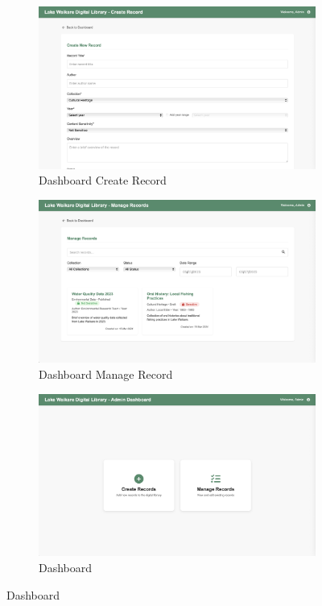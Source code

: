 \begin{figure}[H]
  \begin{subfigure}[b]{0.3\textwidth}
    \includegraphics[width=\textwidth]{screenshot/prototype_dashboard_createrecord.png}
    \caption{Dashboard Create Record}
  \end{subfigure}\hfill
  \begin{subfigure}[b]{0.3\textwidth}
    \includegraphics[width=\textwidth]{screenshot/prototype_dashboard_managerecord.png}
    \caption{Dashboard Manage Record}
  \end{subfigure}\hfill
  \begin{subfigure}[b]{0.3\textwidth}
    \includegraphics[width=\textwidth]{screenshot/prototype_dashboard.png}
    \caption{Dashboard}
  \end{subfigure}


\end{figure}
